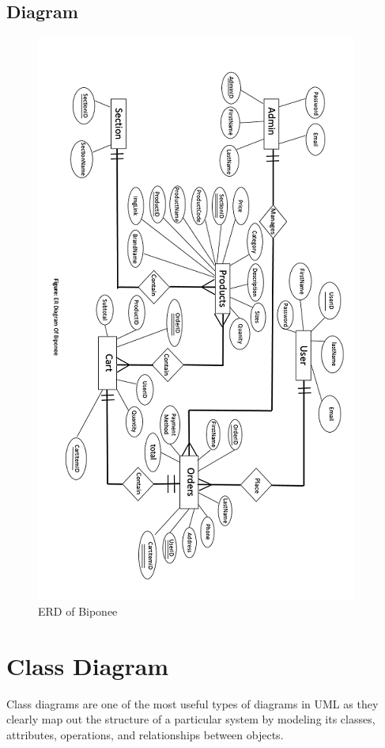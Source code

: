    \subsection{Diagram}
   
   \begin{figure}
 \centering
\includegraphics{figures/erdplus.png}
\caption{ERD of Biponee}
\end{figure}


\newpage

\section{Class Diagram}
Class diagrams are one of the most useful types of diagrams in UML as they clearly map out the structure of a particular system by modeling its classes, attributes, operations, and relationships between objects.\\


